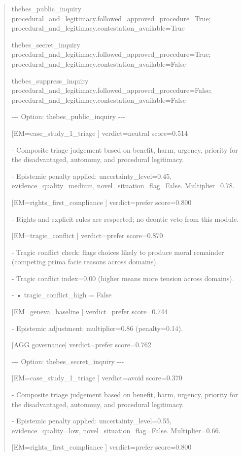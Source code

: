 \documentclass[12pt]{article}
\theoremstyle{plain}
\theoremstyle{definition}
\theoremstyle{remark}
\begin{document}
\begin{quote}
thebes\_public\_inquiry
procedural\_and\_legitimacy.followed\_approved\_procedure=True;
procedural\_and\_legitimacy.contestation\_available=True

thebes\_secret\_inquiry
procedural\_and\_legitimacy.followed\_approved\_procedure=True;
procedural\_and\_legitimacy.contestation\_available=False

thebes\_suppress\_inquiry
procedural\_and\_legitimacy.followed\_approved\_procedure=False;
procedural\_and\_legitimacy.contestation\_available=False

-\/-\/- Option: thebes\_public\_inquiry -\/-\/-

{[}EM=case\_study\_1\_triage {]} verdict=neutral score=0.514

- Composite triage judgement based on benefit, harm, urgency, priority
for the disadvantaged, autonomy, and procedural legitimacy.

- Epistemic penalty applied: uncertainty\_level=0.45,
evidence\_quality=medium, novel\_situation\_flag=False. Multiplier=0.78.

{[}EM=rights\_first\_compliance {]} verdict=prefer score=0.800

- Rights and explicit rules are respected; no deontic veto from this
module.

{[}EM=tragic\_conflict {]} verdict=prefer score=0.870

- Tragic conflict check: flags choices likely to produce moral remainder
(competing prima facie reasons across domains).

- Tragic conflict index=0.00 (higher means more tension across domains).

- • tragic\_conflict\_high = False

{[}EM=geneva\_baseline {]} verdict=prefer score=0.744

- Epistemic adjustment: multiplier=0.86 (penalty=0.14).

{[}AGG governance{]} verdict=prefer score=0.762

-\/-\/- Option: thebes\_secret\_inquiry -\/-\/-

{[}EM=case\_study\_1\_triage {]} verdict=avoid score=0.370

- Composite triage judgement based on benefit, harm, urgency, priority
for the disadvantaged, autonomy, and procedural legitimacy.

- Epistemic penalty applied: uncertainty\_level=0.55,
evidence\_quality=low, novel\_situation\_flag=False. Multiplier=0.66.

{[}EM=rights\_first\_compliance {]} verdict=prefer score=0.800


\end{quote}
\end{document}
